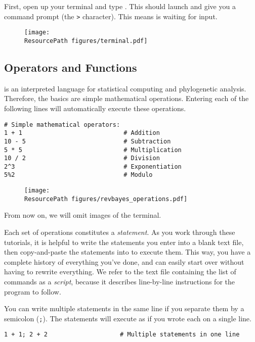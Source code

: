 First, open up your terminal and type \RevBayes.
This should launch \RevBayes and give you a command prompt (the \texttt{>} character).
This means \RevBayes is waiting for input.
\begin{figure}[H]
	\centering
	\texttt{[image: \\ResourcePath figures/terminal.pdf]}
\end{figure}

\subsection{Operators and Functions}

\Rev is an interpreted language for statistical computing and phylogenetic analysis.
Therefore, the basics are simple mathematical operations.
Entering each of the following lines will automatically execute these operations.
{\tt \begin{snugshade*}
\begin{lstlisting}    
# Simple mathematical operators:
1 + 1                            # Addition
10 - 5                           # Subtraction
5 * 5                            # Multiplication
10 / 2                           # Division
2^3                              # Exponentiation
5%2                              # Modulo
\end{lstlisting}
\end{snugshade*}}

\begin{figure}[H]
	\centering
	\texttt{[image: \\ResourcePath figures/revbayes\_operations.pdf]}
\end{figure}
\noindent From now on, we will omit images of the terminal.

Each set of operations constitutes a \emph{statement}.
As you work through these tutorials, it is helpful to write the statements you enter into a blank text file, then copy-and-paste the statements into \Rev to execute them.
This way, you have a complete history of everything you've done, and can easily start over without having to rewrite everything.
We refer to the text file containing the list of commands as a \emph{script}, because it describes line-by-line instructions for the program to follow.

You can write multiple statements in the same line if you separate them by a semicolon (\texttt{;}).
The statements will execute as if you wrote each on a single line.
{\tt \begin{snugshade*}
\begin{lstlisting}    
1 + 1; 2 + 2                    # Multiple statements in one line
\end{lstlisting}
\end{snugshade*}}

